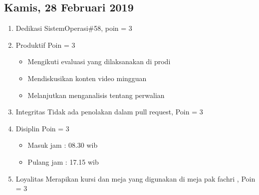 \subsection{Kamis, 28 Februari 2019}
\begin{enumerate}
\item Dedikasi
\subitem SistemOperasi\#58, poin = 3

\item Produktif
\subitem Poin = 3
\begin{itemize}
\item Mengikuti evaluasi yang dilaksanakan di prodi
\item Mendiskusikan konten video mingguan
\item Melanjutkan menganalisis tentang perwalian 
\end{itemize}

\item Integritas
\subitem Tidak ada penolakan dalam pull request, Poin = 3

\item Disiplin
\subitem Poin = 3
\begin{itemize}
\item Masuk jam : 08.30 wib 
\item Pulang jam : 17.15 wib
\end{itemize}

\item Loyalitas
\subitem Merapikan kursi dan meja yang digunakan di meja pak fachri , Poin = 3
\end{enumerate}
